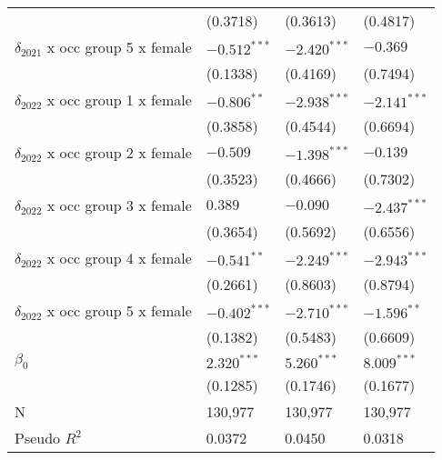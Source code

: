 \begin{tabular}{llll}
                                         &           (0.3718) &           (0.3613) &           (0.4817) \\
$\delta_{2021}$ x occ group 5 x female   &     $-0.512^{***}$ &     $-2.420^{***}$ &           $-0.369$ \\
                                         &           (0.1338) &           (0.4169) &           (0.7494) \\
$\delta_{2022}$ x occ group 1 x female   &      $-0.806^{**}$ &     $-2.938^{***}$ &     $-2.141^{***}$ \\
                                         &           (0.3858) &           (0.4544) &           (0.6694) \\
$\delta_{2022}$ x occ group 2 x female   &           $-0.509$ &     $-1.398^{***}$ &           $-0.139$ \\
                                         &           (0.3523) &           (0.4666) &           (0.7302) \\
$\delta_{2022}$ x occ group 3 x female   &            $0.389$ &           $-0.090$ &     $-2.437^{***}$ \\
                                         &           (0.3654) &           (0.5692) &           (0.6556) \\
$\delta_{2022}$ x occ group 4 x female   &      $-0.541^{**}$ &     $-2.249^{***}$ &     $-2.943^{***}$ \\
                                         &           (0.2661) &           (0.8603) &           (0.8794) \\
$\delta_{2022}$ x occ group 5 x female   &     $-0.402^{***}$ &     $-2.710^{***}$ &      $-1.596^{**}$ \\
                                         &           (0.1382) &           (0.5483) &           (0.6609) \\
$\beta_0$                                &      $2.320^{***}$ &      $5.260^{***}$ &      $8.009^{***}$ \\
                                         &           (0.1285) &           (0.1746) &           (0.1677) \\
N                                        &            130,977 &            130,977 &            130,977 \\
Pseudo $R^2$                             &             0.0372 &             0.0450 &             0.0318 \\
\bottomrule
\end{tabular}
